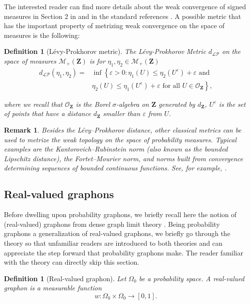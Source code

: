 \documentclass[12pt,twoside,a4paper]{article}
\newtheorem{definition}[theorem]{Definition}
\newtheorem{remark}[theorem]{Remark}
\newcommand{\Space}{\mathbf{Z}}
\newcommand{\Topo}{\mathcal{O}_\Space}
\newcommand{\Meas}{\mathcal{M}_+(\Space)}
\begin{document}
The interested reader can find more details about the weak convergence of signed measures in Section 2 in \cite{abraham2023probabilitygraphons} and in the standard references \cite{Bogachev,BogachevMT1,BogachevMT2,Ethier,MeasurableSetsMeasures,Varadarajan}.
A possible metric that has the important property of metrizing weak convergence on the space of measures is the following:
 
\begin{definition}[Lévy-Prokhorov metric]\label{LevyProk}
 The \emph{Lévy-Prokhorov Metric} $d_{\mathcal{LP}}$ on the space of measures $\Meas$ is for $\eta_1,\eta_2\in \Meas$
$$\begin{aligned}
d_{\mathcal{LP}}\left(\eta_{1}, \eta_{2}\right)=&\inf \left\{\varepsilon>0: \eta_{1}(U) \leq \eta_{2}\left(U^{\varepsilon}\right)+\varepsilon \text{ and } \right.\\
&\left.\eta_{2}(U) \leq \eta_{1}\left(U^{\varepsilon}\right)+\varepsilon  \text{ for all } U \in \Topo\right\},
\end{aligned}$$

where we recall that $\Topo$ is the Borel $\sigma$-algebra on $\Space$ generated by $d_{\Space}$, $U^{\varepsilon}$ is the set of points that have a distance $d_{\Space}$ smaller than $\varepsilon$ from $U$.
\end{definition}


\begin{remark}\label{rmk:metrics}
Besides the Lévy--Prokhorov distance, other classical metrics can be used to metrize the weak topology on the space of probability measures. 
Typical examples are the Kantorovich--Rubinstein norm (also known as the bounded Lipschitz distance), the Fortet--Mourier norm, and norms built from convergence determining sequences of bounded continuous functions. See, for example, \cite{abraham2023probabilitygraphons}.
\end{remark} 
\subsection{Real-valued graphons}\label{sec:realvaluedgraphon}

Before dwelling upon probability graphons, we briefly recall here the notion of (real-valued) graphons from dense graph limit theory \cite{LovaszGraphLimits,LOVASZ2006933,BORGS20081801,borgs2011convergentAnnals}. Being probability graphons a generalization of real-valued graphons, we briefly go through the theory so that unfamiliar readers are introduced to both theories and can appreciate the step forward that probability graphons make. The reader familiar with the theory can directly skip this section.
\begin{definition}[Real-valued graphon]
   Let $\Omega_0$ be a probability space. A \emph{real-valued graphon} is a measurable function
    $$w:\Omega_0\times \Omega_0\rightarrow [0,1].$$
\end{definition}
\end{document}
